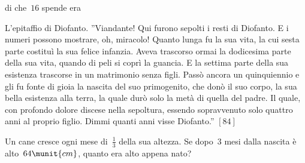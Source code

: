 \begin{htmulticols}{2}
di 
che~\(16\) 
% 
spende 
era 

\begin{esercizio}[*]
\label{ese:14.71}
L'epitaffio di Diofanto. ''Viandante! Qui furono sepolti i resti di Diofanto. E 
i numeri possono mostrare, oh, miracolo! Quanto lunga fu la sua vita, la cui 
sesta parte costituì la sua felice infanzia. Aveva trascorso ormai la 
dodicesima 
parte della sua vita, quando di peli si coprì la guancia. E la settima parte 
della sua esistenza trascorse in un matrimonio senza figli. Passò ancora un 
quinquiennio e gli fu fonte di gioia la nascita del suo primogenito, che donò 
il 
suo corpo, la sua bella esistenza alla terra, la quale durò solo la metà di 
quella del padre. Il quale, con profondo dolore discese nella sepoltura, 
essendo 
sopravvenuto solo quattro anni al proprio figlio. Dimmi quanti anni visse 
Diofanto.'' \hfill \(\left[84\right]\)
\end{esercizio}

\begin{esercizio}[\Ast, \croce]
\label{ese:14.72}
Un cane cresce ogni mese di~\(\frac{1}{3}\) della sua altezza. Se dopo~\(3\) 
mesi 
dalla nascita è alto~\(64\munit{cm}\), quanto era alto appena nato?
\end{esercizio}


\end{htmulticols}
